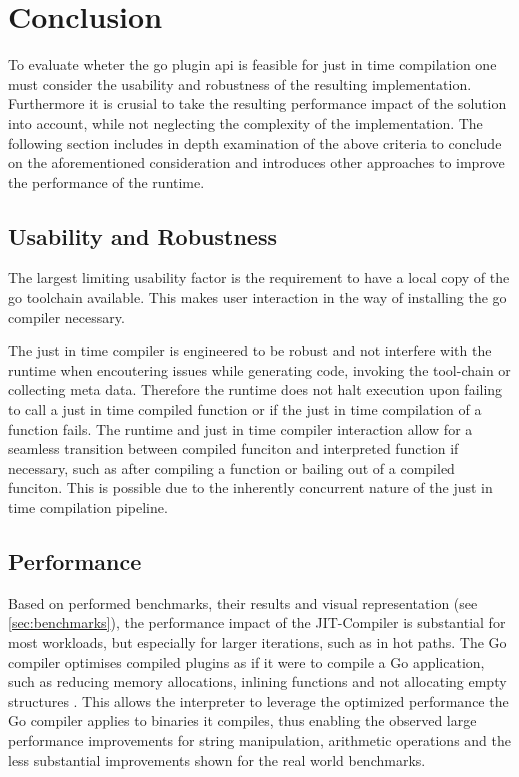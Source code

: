 \chapter{Conclusion}

To evaluate wheter the go plugin api is feasible for just in time compilation
one must consider the usability and robustness of the resulting implementation.
Furthermore it is crusial to take the resulting performance impact of the
solution into account, while not neglecting the complexity of the
implementation. The following section includes in depth examination of the
above criteria to conclude on the aforementioned consideration and introduces
other approaches to improve the performance of the runtime.

\section{Usability and Robustness}

The largest limiting usability factor is the requirement to have a local copy
of the go toolchain available. This makes user interaction in the way of
installing the go compiler necessary. 

The just in time compiler is engineered to be robust and not interfere with the
runtime when encoutering issues while generating code, invoking the tool-chain
or collecting meta data. Therefore the runtime does not halt execution upon
failing to call a just in time compiled function or if the just in time
compilation of a function fails. The runtime and just in time compiler
interaction allow for a seamless transition between compiled funciton and
interpreted function if necessary, such as after compiling a function or
bailing out of a compiled funciton. This is possible due to the inherently
concurrent nature of the just in time compilation pipeline. 

\section{Performance}

Based on performed benchmarks, their results and visual representation (see
\autoref{sec:benchmarks}), the performance impact of the JIT-Compiler is
substantial for most workloads, but especially for larger iterations, such as
in hot paths. The Go compiler optimises compiled plugins as if it were to
compile a Go application, such as reducing memory allocations\cite[Escape
Analysis]{go_wiki_optimization}, inlining
functions\cite[Inlining]{go_wiki_optimization} and not allocating empty
structures \cite[Interface Values]{go_wiki_optimization}. This allows the
interpreter to leverage the optimized performance the Go compiler applies to
binaries it compiles, thus enabling the observed large performance improvements
for string manipulation, arithmetic operations and the less substantial
improvements shown for the real world benchmarks.

